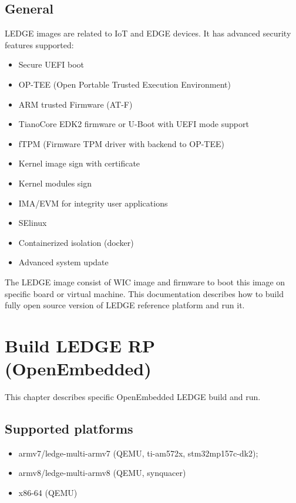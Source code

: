 \documentclass[a4paper,10pt,oneside,english]{sphinxmanual}
\begin{document}
\section{General}
\label{\detokenize{overview:general}}
LEDGE images are related to IoT and EDGE devices. It has advanced security features supported:
\begin{itemize}
\item {} 
Secure UEFI boot

\item {} 
OP-TEE (Open Portable Trusted Execution Environment)

\item {} 
ARM trusted Firmware (AT-F)

\item {} 
TianoCore EDK2 firmware or U-Boot with UEFI mode support

\item {} 
fTPM (Firmware TPM driver with backend to OP-TEE)

\item {} 
Kernel image sign with certificate

\item {} 
Kernel modules sign

\item {} 
IMA/EVM for integrity user applications

\item {} 
SElinux

\item {} 
Containerized isolation (docker)

\item {} 
Advanced system update

\end{itemize}

The LEDGE image consist of WIC image and firmware to boot this image on specific board or virtual machine.
This documentation describes how to build fully open source version of LEDGE reference platform and run it.


\chapter{Build LEDGE RP (OpenEmbedded)}
\label{\detokenize{chapter2-oe:build-ledge-rp-openembedded}}\label{\detokenize{chapter2-oe::doc}}
This chapter describes specific OpenEmbedded LEDGE build and run.


\section{Supported platforms}
\label{\detokenize{chapter2-oe:supported-platforms}}\begin{itemize}
\item {} 
armv7/ledge-multi-armv7 (QEMU, ti-am572x, stm32mp157c-dk2);

\item {} 
armv8/ledge-multi-armv8 (QEMU, synquacer)

\item {} 
x86-64 (QEMU)

\end{itemize}
\end{document}
